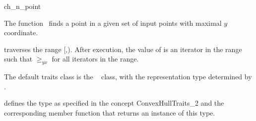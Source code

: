 

\begin{ccRefFunction}{ch_n_point}  %

\ccDefinition
  
The function \ccRefName\ finds a point in a given set  
of input points with maximal $y$ coordinate.


           {traverses the range [,).
            After execution, the value of
             is an iterator in the range such that  $\ge_{yx}$
             for all iterators  in the range.}


The default traits class  is the \cgal\ 
 class,
with the representation type determined by .

 defines the type  as specified in
the concept ConvexHullTraits\_2 and the corresponding member
function that returns an instance of this type.


\ccSeeAlso

 \\
 \\
 \\
 \\
 \\

\end{ccRefFunction}


